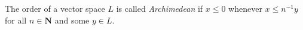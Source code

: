 The order of a vector space $L$ is called \emph{Archimedean} if $x \leq 0$ whenever $x \leq n^{-1}y$ for all $n \in \mathbf{N}$ and some $y \in L$.
